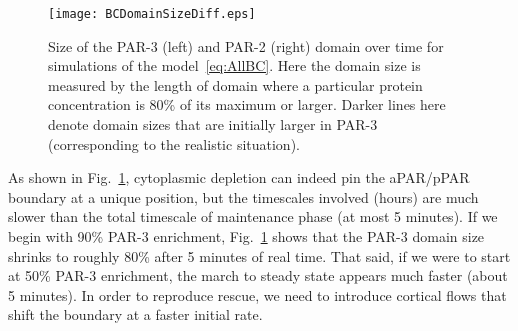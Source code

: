 \documentclass[11pt]{article}
\newcommand{\6}[1]{#1_{\text{6}}}
\newcommand{\3}[1]{#1_{\text{3}}}
\begin{document}
\begin{figure}
\centering
\texttt{[image: BCDomainSizeDiff.eps]}
\caption{\label{fig:BCDSD} Size of the PAR-3 (left) and PAR-2 (right) domain over time for simulations of the model\ \eqref{eq:AllBC}. Here the domain size is measured by the length of domain where a particular protein concentration is 80\% of its maximum or larger. Darker lines here denote domain sizes that are initially larger in PAR-3 (corresponding to the realistic situation).}
\end{figure}


As shown in Fig.\ \ref{fig:BCDSD}, cytoplasmic depletion can indeed pin the aPAR/pPAR boundary at a unique position, but the timescales involved (hours) are much slower than the total timescale of maintenance phase (at most 5 minutes). If we begin with 90\% PAR-3 enrichment, Fig.\ \ref{fig:BCDSD} shows that the PAR-3 domain size shrinks to roughly 80\% after 5 minutes of real time. That said, if we were to start at 50\% PAR-3 enrichment, the march to steady state appears much faster (about 5 minutes). In order to reproduce rescue, we need to introduce cortical flows that shift the boundary at a faster initial rate. 
\end{document}
